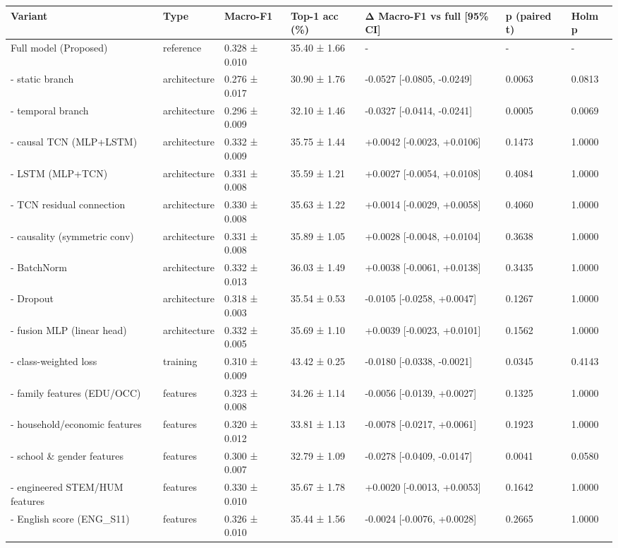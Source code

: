 \begin{tabular}{lllllll}
\toprule
Variant & Type & Macro-F1 & Top-1 acc (\%) & Δ Macro-F1 vs full [95\% CI] & p (paired t) & Holm p \\
\midrule
Full model (Proposed) & reference & 0.328 ± 0.010 & 35.40 ± 1.66 & - & - & - \\
- static branch & architecture & 0.276 ± 0.017 & 30.90 ± 1.76 & -0.0527 [-0.0805, -0.0249] & 0.0063 & 0.0813 \\
- temporal branch & architecture & 0.296 ± 0.009 & 32.10 ± 1.46 & -0.0327 [-0.0414, -0.0241] & 0.0005 & 0.0069 \\
- causal TCN (MLP+LSTM) & architecture & 0.332 ± 0.009 & 35.75 ± 1.44 & +0.0042 [-0.0023, +0.0106] & 0.1473 & 1.0000 \\
- LSTM (MLP+TCN) & architecture & 0.331 ± 0.008 & 35.59 ± 1.21 & +0.0027 [-0.0054, +0.0108] & 0.4084 & 1.0000 \\
- TCN residual connection & architecture & 0.330 ± 0.008 & 35.63 ± 1.22 & +0.0014 [-0.0029, +0.0058] & 0.4060 & 1.0000 \\
- causality (symmetric conv) & architecture & 0.331 ± 0.008 & 35.89 ± 1.05 & +0.0028 [-0.0048, +0.0104] & 0.3638 & 1.0000 \\
- BatchNorm & architecture & 0.332 ± 0.013 & 36.03 ± 1.49 & +0.0038 [-0.0061, +0.0138] & 0.3435 & 1.0000 \\
- Dropout & architecture & 0.318 ± 0.003 & 35.54 ± 0.53 & -0.0105 [-0.0258, +0.0047] & 0.1267 & 1.0000 \\
- fusion MLP (linear head) & architecture & 0.332 ± 0.005 & 35.69 ± 1.10 & +0.0039 [-0.0023, +0.0101] & 0.1562 & 1.0000 \\
- class-weighted loss & training & 0.310 ± 0.009 & 43.42 ± 0.25 & -0.0180 [-0.0338, -0.0021] & 0.0345 & 0.4143 \\
- family features (EDU/OCC) & features & 0.323 ± 0.008 & 34.26 ± 1.14 & -0.0056 [-0.0139, +0.0027] & 0.1325 & 1.0000 \\
- household/economic features & features & 0.320 ± 0.012 & 33.81 ± 1.13 & -0.0078 [-0.0217, +0.0061] & 0.1923 & 1.0000 \\
- school \& gender features & features & 0.300 ± 0.007 & 32.79 ± 1.09 & -0.0278 [-0.0409, -0.0147] & 0.0041 & 0.0580 \\
- engineered STEM/HUM features & features & 0.330 ± 0.010 & 35.67 ± 1.78 & +0.0020 [-0.0013, +0.0053] & 0.1642 & 1.0000 \\
- English score (ENG\_S11) & features & 0.326 ± 0.010 & 35.44 ± 1.56 & -0.0024 [-0.0076, +0.0028] & 0.2665 & 1.0000 \\
\bottomrule
\end{tabular}
